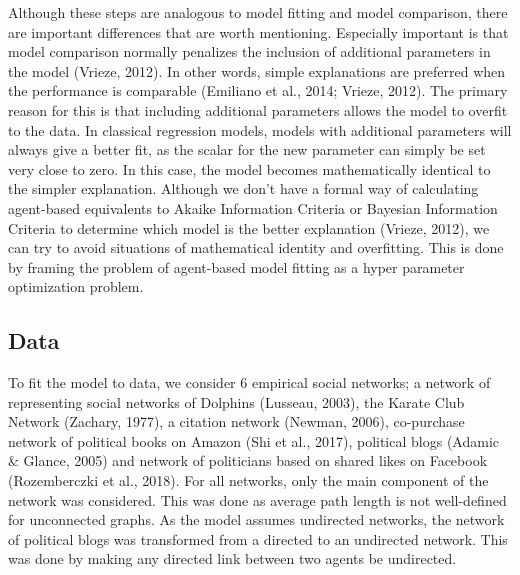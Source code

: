 \documentclass{article}
\begin{document}
Although these steps are analogous to model fitting and model comparison, there are important differences that are worth mentioning. Especially important is that model comparison normally penalizes the inclusion of additional parameters in the model (Vrieze, 2012). In other words, simple explanations are preferred when the performance is comparable (Emiliano et al., 2014; Vrieze, 2012). The primary reason for this is that including additional parameters allows the model to overfit to the data. In classical regression models, models with additional parameters will always give a better fit, as the scalar for the new parameter can simply be set very close to zero. In this case, the model becomes mathematically identical to the simpler explanation. Although we don’t have a formal way of calculating agent-based equivalents to Akaike Information Criteria or Bayesian Information Criteria to determine which model is the better explanation (Vrieze, 2012), we can try to avoid situations of mathematical identity and overfitting. This is done by framing the problem of agent-based model fitting as a hyper parameter optimization problem. 


\subsection{Data}
To fit the model to data, we consider 6 empirical social networks; a network of representing social networks of Dolphins (Lusseau, 2003), the Karate Club Network (Zachary, 1977), a citation network (Newman, 2006), co-purchase network of political books on Amazon (Shi et al., 2017), political blogs (Adamic \& Glance, 2005) and network of politicians based on shared likes on Facebook (Rozemberczki et al., 2018). For all networks, only the main component of the network was considered. This was done as average path length is not well-defined for unconnected graphs. As the model assumes undirected networks, the network of political blogs was transformed from a directed to an undirected network. This was done by making any directed link between two agents be undirected. 
\end{document}
